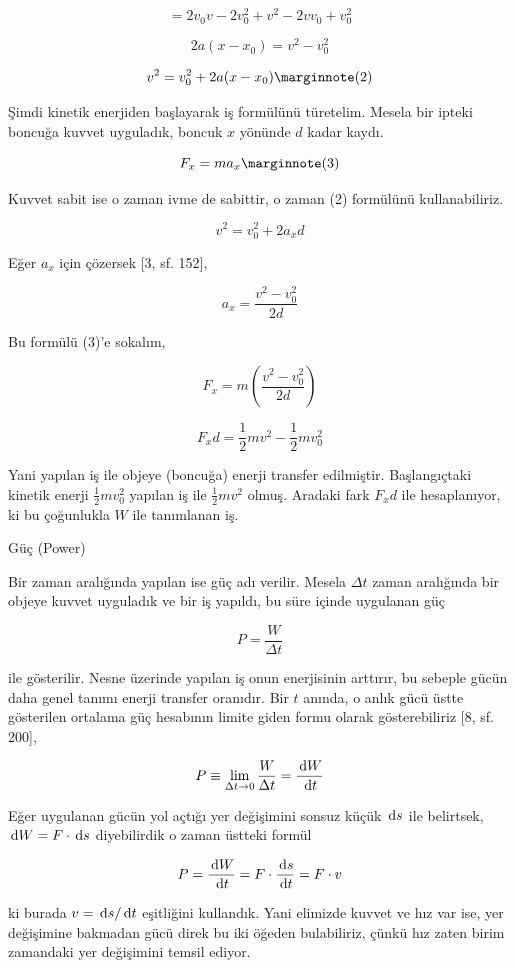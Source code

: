\documentclass[12pt,fleqn]{article}\usepackage{../../common}
\begin{document}
$$
= 2 v_0 v - 2 v_0^2 + v^2 - 2 v v_0 + v_0^2
$$

$$
2a (x-x_0) = v^2 - v_0^2 
$$

$$
v^2 = v_0^2 + 2a (x-x_0)  
\mlabel{2}
$$

Şimdi kinetik enerjiden başlayarak iş formülünü türetelim. Mesela bir
ipteki boncuğa kuvvet uyguladık, boncuk $x$ yönünde $d$ kadar kaydı. 

$$
F_x = m a_x
\mlabel{3}
$$

Kuvvet sabit ise o zaman ivme de sabittir, o zaman (2) formülünü
kullanabiliriz. 

$$
v^2 = v_0^2 + 2 a_x d
$$

Eğer $a_x$ için çözersek [3, sf. 152], 

$$
a_x = \frac{v^2 - v_0^2 }{2 d}
$$

Bu formülü (3)'e sokalım,

$$
F_x = m \left( \frac{v^2 - v_0^2 }{2d} \right)
$$

$$
F_x d = \frac{1}{2} m v^2 - \frac{1}{2} m v_0^2
$$

Yani yapılan iş ile objeye (boncuğa) enerji transfer
edilmiştir. Başlangıçtaki kinetik enerji $\frac{1}{2} m v_0^2$ yapılan iş
ile $\frac{1}{2} m v^2$ olmuş. Aradaki fark $F_x d$ ile hesaplanıyor, ki bu
çoğunlukla $W$ ile tanımlanan iş. 

Güç (Power)

Bir zaman aralığında yapılan ise güç adı verilir. Mesela $\Delta t$ zaman
aralığında bir objeye kuvvet uyguladık ve bir iş yapıldı, bu süre içinde
uygulanan güç

$$
P = \frac{W}{\Delta t}
$$

ile gösterilir. Nesne üzerinde yapılan iş onun enerjisinin arttırır, bu sebeple
gücün daha genel tanımı enerji transfer oranıdır. Bir $t$ anında, o anlık gücü
üstte gösterilen ortalama güç hesabının limite giden formu olarak
gösterebiliriz [8, sf. 200],

$$
P \equiv \lim_{\Delta t \to 0} \frac{W}{\Delta t} = \frac{\,\mathrm{d} W}{\,\mathrm{d} t}
$$

Eğer uygulanan gücün yol açtığı yer değişimini sonsuz küçük $\,\mathrm{d} s$ ile
belirtsek, $\,\mathrm{d} W = F \cdot \,\mathrm{d} s$ diyebilirdik o zaman üstteki formül

$$
P = \frac{\,\mathrm{d} W}{\,\mathrm{d} t} = F \cdot \frac{\,\mathrm{d} s}{\,\mathrm{d} t} = F \cdot v
$$

ki burada $v = \,\mathrm{d} s / \,\mathrm{d} t$ eşitliğini kullandık. Yani elimizde kuvvet ve hız
var ise, yer değişimine bakmadan gücü direk bu iki öğeden bulabiliriz, çünkü hız
zaten birim zamandaki yer değişimini temsil ediyor.
\end{document}
